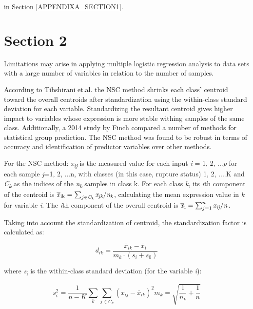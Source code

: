    in 
Section \ref{APPENDIXA_SECTION1}.

\section{Section 2}\label{Nearest Shrunken Centroid}
Limitations may arise in applying multiple logistic regression analysis to data sets with a large number of variables in relation to the number of samples.


According to Tibshirani et.al. \cite{tibshirani2002diagnosis} the NSC method shrinks each class' centroid toward the overall centroids after standardization using the within-class standard deviation for each variable. Standardizing the resultant centroid gives higher impact to variables whose expression is more stable withing samples of the same class. Additionally, a 2014 study by Finch \cite{finch2014comparison} compared a number of methods for statistical group prediction. The NSC method was found to be robust in terms of accuracy and identification of predictor variables over other methods.

For the NSC method: \textit{x\textsubscript{ij}} is the measured value for each input \textit{i}  = 1, 2, ...\textit{p} for each sample \textit{j}=1, 2, ...n, with classes (in this case, rupture status) 1, 2, ....K and \textit{C\textsubscript{k}} as the indices of the \textit{n\textsubscript{k}} samples in class k. For each class \textit{k}, its \textit{i}th component of the centroid is $\overline{\mbox{\textit{x}}}\textsubscript{ik} = \sum_{j\in \textit{C\textsubscript{k}}} \textit{x\textsubscript{jk}}/\textit{n\textsubscript{k}}$, calculating the mean expression value in \textit{k} for variable \textit{i}. The \textit{i}th component of the overall centroid is $\overline{\mbox{\textit{x}}}\textsubscript{i} = \sum_{j=1}^{n} \textit{x\textsubscript{ij}} / \textit{n}$.

Taking into account the standardization of centroid, the standardization factor is calculated as:

\begin{equation} \label{NSC_d}
d_{ik} = \frac{\overline{x}_{ik} - \overline{x}_i}{m_k \cdot (s_i + s_0)}
\end{equation}

where \textit{s}\textsubscript{i} is the within-class standard deviation (for the variable \textit{i}):

\begin{equation}
s_i^2 = \frac{1}{n-K} \sum_k \sum_{j \in C_k} (x_{ij} - \overline{x}_{ik})^2
m_k = \sqrt{\frac{1}{n_k} + \frac{1}{n}}
\end{equation}

